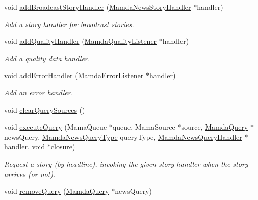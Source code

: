 \begin{CompactItemize}
void \hyperlink{classWombat_1_1MamdaNewsManager_2b8b967d8a889c793f74f0a8c852a1d7}{add\-Broadcast\-Story\-Handler} (\hyperlink{classWombat_1_1MamdaNewsStoryHandler}{Mamda\-News\-Story\-Handler} $\ast$handler)
\begin{CompactList}\small\item\em Add a story handler for broadcast stories. \item\end{CompactList}\item 
void \hyperlink{classWombat_1_1MamdaNewsManager_6146a9fc547ee5b7beaf22a03457ca34}{add\-Quality\-Handler} (\hyperlink{classWombat_1_1MamdaQualityListener}{Mamda\-Quality\-Listener} $\ast$handler)
\begin{CompactList}\small\item\em Add a quality data handler. \item\end{CompactList}\item 
void \hyperlink{classWombat_1_1MamdaNewsManager_28c886b6b2eb8467f1972c9cfaed705f}{add\-Error\-Handler} (\hyperlink{classWombat_1_1MamdaErrorListener}{Mamda\-Error\-Listener} $\ast$handler)
\begin{CompactList}\small\item\em Add an error handler. \item\end{CompactList}\item 
void \hyperlink{classWombat_1_1MamdaNewsManager_3c8ca28fed15f8c88a8d646348a65d38}{clear\-Query\-Sources} ()
\item 
void \hyperlink{classWombat_1_1MamdaNewsManager_0ac9a7acd98ae805071fc174905fe5b5}{execute\-Query} (Mama\-Queue $\ast$queue, Mama\-Source $\ast$source, \hyperlink{classWombat_1_1MamdaQuery}{Mamda\-Query} $\ast$news\-Query, \hyperlink{namespaceWombat_8c12fe7ccc6f40bd1efe733bb0673ad5}{Mamda\-News\-Query\-Type} query\-Type, \hyperlink{classWombat_1_1MamdaNewsQueryHandler}{Mamda\-News\-Query\-Handler} $\ast$handler, void $\ast$closure)
\begin{CompactList}\small\item\em Request a story (by headline), invoking the given story handler when the story arrives (or not). \item\end{CompactList}\item 
void \hyperlink{classWombat_1_1MamdaNewsManager_b30507a8bef38f19cb181b7727481fb4}{remove\-Query} (\hyperlink{classWombat_1_1MamdaQuery}{Mamda\-Query} $\ast$news\-Query)
\item 

\end{CompactItemize}
